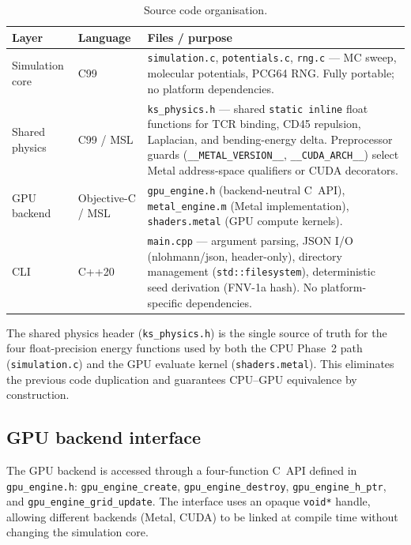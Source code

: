 \documentclass[11pt,a4paper]{article}
\begin{document}
\begin{table}[ht]
  \centering
  \caption{Source code organisation.}
  \label{tab:arch}
  \small
  \begin{tabular}{@{}llp{7cm}@{}}
    \toprule
    \textbf{Layer} & \textbf{Language} & \textbf{Files / purpose} \\
    \midrule
    Simulation core &
      C99 &
      \texttt{simulation.c}, \texttt{potentials.c}, \texttt{rng.c}
      --- MC sweep, molecular potentials, PCG64 RNG.
      Fully portable; no platform dependencies. \\[4pt]
    Shared physics &
      C99 / MSL &
      \texttt{ks\_physics.h} --- shared \texttt{static inline} float
      functions for TCR binding, CD45 repulsion, Laplacian, and
      bending-energy delta.  Preprocessor guards
      (\texttt{\_\_METAL\_VERSION\_\_}, \texttt{\_\_CUDA\_ARCH\_\_})
      select Metal address-space qualifiers or CUDA decorators. \\[4pt]
    GPU backend &
      Objective-C / MSL &
      \texttt{gpu\_engine.h} (backend-neutral C~API),
      \texttt{metal\_engine.m} (Metal implementation),
      \texttt{shaders.metal} (GPU compute kernels). \\[4pt]
    CLI &
      C++20 &
      \texttt{main.cpp} --- argument parsing, JSON I/O
      (nlohmann/json, header-only), directory management
      (\texttt{std::filesystem}), deterministic seed derivation
      (FNV-1a hash).  No platform-specific dependencies. \\
    \bottomrule
  \end{tabular}
\end{table}

The shared physics header (\texttt{ks\_physics.h}) is the single
source of truth for the four float-precision energy functions used by
both the CPU Phase~2 path (\texttt{simulation.c}) and the GPU
evaluate kernel (\texttt{shaders.metal}).  This eliminates the
previous code duplication and guarantees CPU--GPU equivalence by
construction.

\subsection{GPU backend interface}

The GPU backend is accessed through a four-function C~API defined in
\texttt{gpu\_engine.h}: \texttt{gpu\_engine\_create},
\texttt{gpu\_engine\_destroy}, \texttt{gpu\_engine\_h\_ptr}, and
\texttt{gpu\_engine\_grid\_update}.  The interface uses an opaque
\texttt{void*} handle, allowing different backends (Metal, CUDA) to be
linked at compile time without changing the simulation core.
\end{document}
